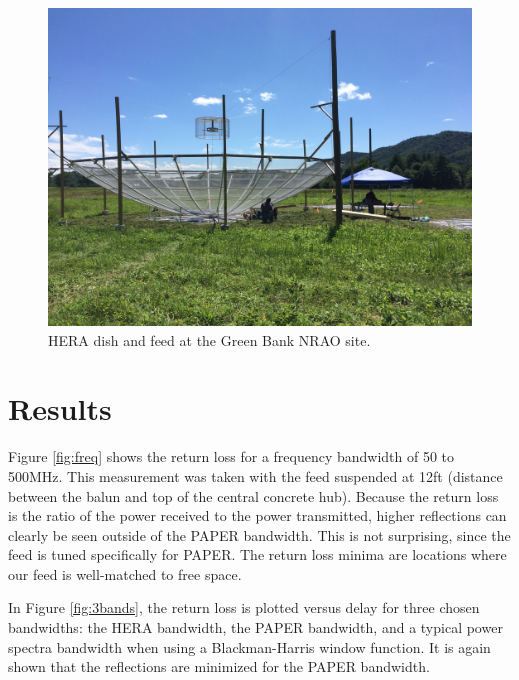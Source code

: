 \documentclass[12pt,preprint]{aastex}
\begin{document}
\begin{figure}
\centering
\includegraphics[trim={2cm 20cm 30cm 15cm},clip, totalheight=0.3\textheight]{plots/heradish.jpg}
\caption{HERA dish and feed at the Green Bank NRAO site.}
\label{fig:heradish}
\end{figure}

\section{Results}

Figure \ref{fig:freq} shows the return loss for a frequency bandwidth of 50 to 500MHz. This measurement was taken with the feed suspended at 12ft (distance between the balun and top of the central concrete hub). Because the return loss is the ratio of the power received to the power transmitted, higher reflections can clearly be seen outside of the PAPER bandwidth. This is not surprising, since the feed is tuned specifically for PAPER. The return loss minima are locations where our feed is well-matched to free space.

In Figure \ref{fig:3bands}, the return loss is plotted versus delay for three chosen bandwidths: the HERA bandwidth, the PAPER bandwidth, and a typical power spectra bandwidth when using a Blackman-Harris window function. It is again shown that the reflections are minimized for the PAPER bandwidth. 
\end{document}
